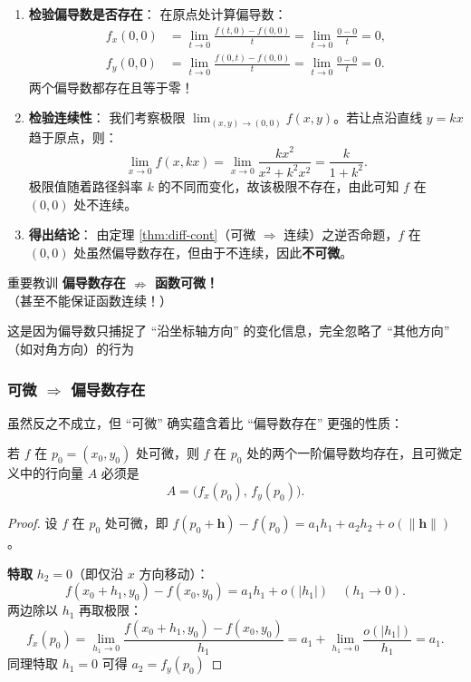\documentclass[lang=cn,11pt]{elegantbook}
\begin{document}
\begin{solution}
\begin{enumerate}
  \item \textbf{检验偏导数是否存在}：
  在原点处计算偏导数：
  \begin{align*}
  f_x(0,0)&=\lim_{t\to 0}\frac{f(t,0)-f(0,0)}{t} =\lim_{t\to 0}\frac{0-0}{t}=0,\\[6pt]
  f_y(0,0)&=\lim_{t\to 0}\frac{f(0,t)-f(0,0)}{t} =\lim_{t\to 0}\frac{0-0}{t}=0.
  \end{align*}
  两个偏导数都存在且等于零！
  
  \item \textbf{检验连续性}：
  我们考察极限 $\displaystyle\lim_{(x,y)\to(0,0)}f(x,y)$。若让点沿直线 $y=kx$ 趋于原点，则：
  \[
  \lim_{x\to 0}f(x,kx) = \lim_{x\to 0}\frac{kx^2}{x^2+k^2x^2} = \frac{k}{1+k^2}.
  \]
  极限值随着路径斜率 $k$ 的不同而变化，故该极限不存在，由此可知 $f$ 在 $(0,0)$ 处不连续。
  
  \item \textbf{得出结论}：
  由定理 \ref{thm:diff-cont}（可微 $\Rightarrow$ 连续）之逆否命题，$f$ 在 $(0,0)$ 处虽然偏导数存在，但由于不连续，因此\textbf{不可微}。
\end{enumerate}
\begin{note}{重要教训}
\centering
\textbf{偏导数存在 $\nRightarrow$ 函数可微！}\\
（甚至不能保证函数连续！）
\end{note}
这是因为偏导数只捕捉了 ``沿坐标轴方向'' 的变化信息，完全忽略了 ``其他方向'' （如对角方向）的行为
\end{solution}

\subsubsection*{可微 $\Rightarrow$ 偏导数存在}

虽然反之不成立，但 ``可微'' 确实蕴含着比 ``偏导数存在'' 更强的性质：

\begin{theorem} \label{thm:diff-pd-exist}
若 $f$ 在 $p_0=(x_0,y_0)$ 处可微，则 $f$ 在 $p_0$ 处的两个一阶偏导数均存在，且可微定义中的行向量 $A$ 必须是
\[
A=\bigl(f_x(p_0),\,f_y(p_0)\bigr).
\]
\end{theorem}

\begin{proof}
设 $f$ 在 $p_0$ 处可微，即 $f(p_0+\boldsymbol h)-f(p_0)=a_1h_1+a_2h_2+o(\|\boldsymbol h\|)$。

\textbf{特取} $h_2=0$（即仅沿 $x$ 方向移动）：
\[
f(x_0+h_1,y_0)-f(x_0,y_0)=a_1h_1+o(|h_1|) \quad(h_1\to 0).
\]
两边除以 $h_1$ 再取极限：
\[
f_x(p_0)=\lim_{h_1\to 0}\frac{f(x_0+h_1,y_0)-f(x_0,y_0)}{h_1} =a_1+\lim_{h_1\to 0}\frac{o(|h_1|)}{h_1}=a_1.
\]
同理特取 $h_1=0$ 可得 $a_2=f_y(p_0)$
\end{proof}
\end{document}
